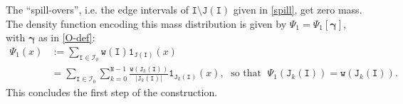 \documentclass[12pt, twoside]{article}
\theoremstyle{definition}
\numberwithin{equation}{section}
\begin{document}
The ``spill-overs'', i.e. the edge intervals of $\mathtt I \setminus \mathtt J(\mathtt I)$ given in \eqref{spill}, get zero mass. The density function encoding this mass distribution is given by $\Psi_1 = \Psi_1[\pmb{\gamma}]$, with $\pmb{\gamma}$ as in \eqref{O-def}:
\begin{align}
 \Psi_1(x) &:= \sum_{\mathtt I \in \mathscr{I}_0} \mathtt w(\mathtt I)  \mathtt 1_{\mathtt J(\mathtt I)}(x) \label{intermediate-density-2} \\ &= \sum_{\mathtt I \in \mathscr{I}_0} \sum_{k=0}^{\mathtt N-1} \frac{\mathtt w(\mathtt J_k(\mathtt I))}{|\mathtt J_k(\mathtt I)|} \mathtt 1_{\mathtt J_k(\mathtt I)}(x), \; \text{ so that } \; \Psi_1(\mathtt J_k(\mathtt I)) = \mathtt w(\mathtt J_k(\mathtt I)).  \label{intermediate-density}
\end{align} 
This concludes the first step of the construction. 
\end{document}
